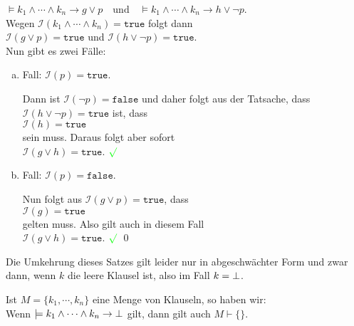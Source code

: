 \begin{enumerate}
      $\models k_1 \wedge \cdots \wedge k_n \rightarrow g \vee p \quad \mathrm{und} \quad 
         \models k_1 \wedge \cdots \wedge k_n \rightarrow h \vee \neg p
      $.
      \\[0.2cm]
      Wegen $\mathcal{I}(k_1 \wedge \cdots \wedge k_n) = \mathtt{true}$ folgt dann
      \\[0.2cm]
      \hspace*{1.3cm}
      $\mathcal{I}(g \vee p) = \mathtt{true}$ \quad und \quad $\mathcal{I}(h \vee \neg p) = \mathtt{true}$.
      \\[0.2cm]
      Nun gibt es zwei F\"alle:
      \begin{enumerate}[(a)]
      \item Fall: $\mathcal{I}(p) = \mathtt{true}$.

            Dann ist $\mathcal{I}(\neg p) = \mathtt{false}$ und daher folgt aus der Tatsache, dass 
            $\mathcal{I}(h \vee \neg p) = \mathtt{true}$ ist, dass
            \\[0.2cm]
            \hspace*{1.3cm}
            $\mathcal{I}(h) = \mathtt{true}$
            \\[0.2cm]
            sein muss.  Daraus folgt aber sofort
            \\[0.2cm]
            \hspace*{1.3cm}
            $\mathcal{I}(g \vee h) = \mathtt{true}$.  $\color{green}\surd$
      \item Fall: $\mathcal{I}(p) = \mathtt{false}$.

            Nun folgt aus $\mathcal{I}(g \vee p) = \mathtt{true}$, dass
            \\[0.2cm]
            \hspace*{1.3cm}
            $\mathcal{I}(g) = \mathtt{true}$
            \\[0.2cm]
            gelten muss.  Also gilt auch in diesem Fall
            \\[0.2cm]
            \hspace*{1.3cm}
            $\mathcal{I}(g \vee h) = \mathtt{true}$.  $\color{green}\surd$ 
            \qed
      \end{enumerate}
\end{enumerate}

\noindent
Die Umkehrung dieses Satzes gilt leider nur in abgeschw\"{a}chter Form und zwar dann, wenn $k$
die leere Klausel ist, also im Fall $k = \bot$.
\begin{Satz} \label{widerlegungs-vollstaendig}
  Ist  $M = \{k_1, \cdots, k_n \}$ eine Menge von Klauseln,
  so haben wir: \\[0.1cm]
  \hspace*{1.3cm} 
  Wenn $\models k_1 \wedge \cdots \wedge k_n \rightarrow \bot$ gilt, dann gilt auch  $M \vdash \{\}$.
\end{Satz}
\vspace*{0.2cm}



